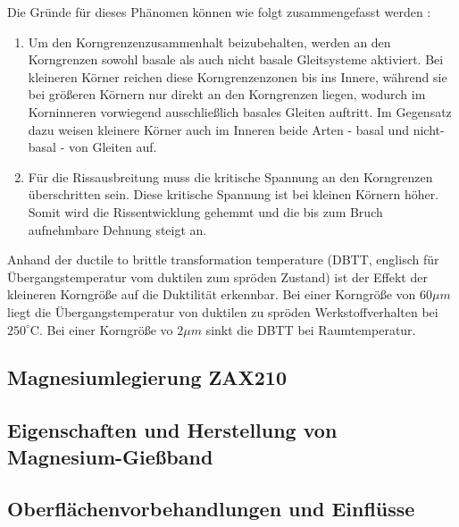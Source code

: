 Die Gründe für dieses Phänomen können wie folgt zusammengefasst werden \cite{NarayanaMurty.2015}:
\begin{enumerate}
	\item Um den Korngrenzenzusammenhalt beizubehalten, werden an den Korngrenzen sowohl basale als auch nicht basale Gleitsysteme aktiviert.
	Bei kleineren Körner reichen diese Korngrenzenzonen bis ins Innere, während sie bei größeren Körnern nur direkt an den Korngrenzen liegen, wodurch im Korninneren vorwiegend ausschließlich basales Gleiten auftritt.
	Im Gegensatz dazu weisen kleinere Körner auch im Inneren beide Arten - basal und nicht-basal - von Gleiten auf.
	\item Für die Rissausbreitung muss die kritische Spannung an den Korngrenzen überschritten sein.
	Diese kritische Spannung ist bei kleinen Körnern höher.
	Somit wird die Rissentwicklung gehemmt und die bis zum Bruch aufnehmbare Dehnung steigt an.
	\end{enumerate}

Anhand der ductile to brittle transformation temperature (DBTT, englisch für Übergangstemperatur vom duktilen zum spröden Zustand) ist der Effekt der kleineren Korngröße auf die Duktilität erkennbar.
Bei einer Korngröße von $60 \mu m$ liegt die Übergangstemperatur von duktilen zu spröden Werkstoffverhalten bei $250^\circ\text{C}$.
Bei einer Korngröße vo $2\mu m$ sinkt die DBTT bei Raumtemperatur. \cite{NarayanaMurty.2015}



\subsection{Magnesiumlegierung ZAX210}\label{sec:ZAX}

\subsection{Eigenschaften und Herstellung von Magnesium-Gießband}

\subsection{Oberflächenvorbehandlungen und Einflüsse}\label{sec:Oberflächen}



